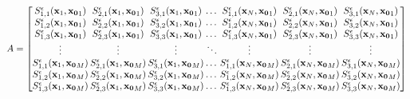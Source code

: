 \begin{equation*}
A = 
\begingroup
\setlength\arraycolsep{1pt}
\begin{bmatrix}
S^{\epsilon}_{1,1}(\mathbf{x}_1,\mathbf{x_{0}}_1) & S^{\epsilon}_{2,1}(\mathbf{x}_1,\mathbf{x_{0}}_1) & S^{\epsilon}_{3,1}(\mathbf{x}_1,\mathbf{x_{0}}_1) & \dots & S^{\epsilon}_{1,1}(\mathbf{x}_N,\mathbf{x_{0}}_1) & S^{\epsilon}_{2,1}(\mathbf{x}_N,\mathbf{x_{0}}_1) & S^{\epsilon}_{3,1}(\mathbf{x}_N,\mathbf{x_{0}}_1)\\
S^{\epsilon}_{1,2}(\mathbf{x}_1,\mathbf{x_{0}}_1) & S^{\epsilon}_{2,2}(\mathbf{x}_1,\mathbf{x_{0}}_1) & S^{\epsilon}_{3,2}(\mathbf{x}_1,\mathbf{x_{0}}_1) & \dots & S^{\epsilon}_{1,2}(\mathbf{x}_N,\mathbf{x_{0}}_1) & S^{\epsilon}_{2,2}(\mathbf{x}_N,\mathbf{x_{0}}_1) & S^{\epsilon}_{3,2}(\mathbf{x}_N,\mathbf{x_{0}}_1)\\
S^{\epsilon}_{1,3}(\mathbf{x}_1,\mathbf{x_{0}}_1) & S^{\epsilon}_{2,3}(\mathbf{x}_1,\mathbf{x_{0}}_1) & S^{\epsilon}_{3,3}(\mathbf{x}_1,\mathbf{x_{0}}_1) & \dots & S^{\epsilon}_{1,3}(\mathbf{x}_N,\mathbf{x_{0}}_1) & S^{\epsilon}_{2,3}(\mathbf{x}_N,\mathbf{x_{0}}_1) & S^{\epsilon}_{3,3}(\mathbf{x}_N,\mathbf{x_{0}}_1)\\
\vdots & \vdots & \vdots & \ddots & \vdots & \vdots & \vdots \\
S^{\epsilon}_{1,1}(\mathbf{x}_1,\mathbf{x_{0}}_M) & S^{\epsilon}_{2,1}(\mathbf{x}_1,\mathbf{x_{0}}_M) & S^{\epsilon}_{3,1}(\mathbf{x}_1,\mathbf{x_{0}}_M) & \dots & S^{\epsilon}_{1,1}(\mathbf{x}_N,\mathbf{x_{0}}_M) & S^{\epsilon}_{2,1}(\mathbf{x}_N,\mathbf{x_{0}}_M) & S^{\epsilon}_{3,1}(\mathbf{x}_N,\mathbf{x_{0}}_M)  \\
S^{\epsilon}_{1,2}(\mathbf{x}_1,\mathbf{x_{0}}_M) & S^{\epsilon}_{2,2}(\mathbf{x}_1,\mathbf{x_{0}}_M) & S^{\epsilon}_{3,2}(\mathbf{x}_1,\mathbf{x_{0}}_M) & \dots & S^{\epsilon}_{1,2}(\mathbf{x}_N,\mathbf{x_{0}}_M) & S^{\epsilon}_{2,2}(\mathbf{x}_N,\mathbf{x_{0}}_M) & S^{\epsilon}_{3,2}(\mathbf{x}_N,\mathbf{x_{0}}_M) \\
S^{\epsilon}_{1,3}(\mathbf{x}_1,\mathbf{x_{0}}_M) & S^{\epsilon}_{2,3}(\mathbf{x}_1,\mathbf{x_{0}}_M) & S^{\epsilon}_{3,3}(\mathbf{x}_1,\mathbf{x_{0}}_M) & \dots & S^{\epsilon}_{1,3}(\mathbf{x}_N,\mathbf{x_{0}}_M) & S^{\epsilon}_{2,3}(\mathbf{x}_N,\mathbf{x_{0}}_M) & S^{\epsilon}_{3,3}(\mathbf{x}_N,\mathbf{x_{0}}_M) \\
\end{bmatrix}
\endgroup
\end{equation*}
\normalsize

